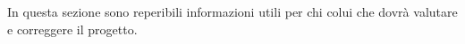 In questa sezione sono reperibili informazioni utili per chi colui che dovrà valutare e correggere il progetto.